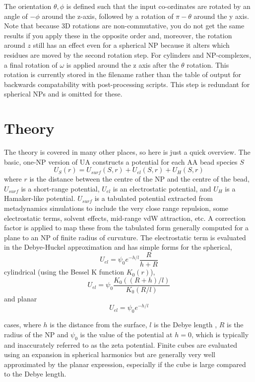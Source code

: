 \documentclass[10pt,a4paper,onecolumn]{report}
\begin{document}
 The orientation $\theta,\phi$ is defined such that the input co-ordinates are rotated by an angle of $-\phi$ around the z-axis, followed by a rotation of $\pi - \theta$ around the y axis. Note that because 3D rotations are non-commutative, you do not get the same results if you apply these in the opposite order and, moreover, the rotation around $z$ still has an effect even for a spherical NP because it alters which residues are moved by the second rotation step.  For cylinders and NP-complexes, a final rotation of $\omega$ is applied around the z axis after the $\theta$ rotation. This rotation is currently stored in the filename rather than the table of output for backwards compatability with post-processing scripts. This step is redundant for spherical NPs and is omitted for these. 

\section{Theory}
The theory is covered in many other places, so here is just a quick overview. The basic, one-NP version of UA constructs a potential for each AA bead species $S$
\begin{equation}
U_S(r) =   U_{surf}(S,r) + U_{el}(S,r) +  U_H(S,r)
\end{equation} 
 where $r$ is the distance between the centre of the NP and the centre of the bead, $U_{surf}$ is a short-range potential, $U_{el}$ is an electrostatic potential, and  $U_H$ is a Hamaker-like potential. $U_{surf}$ is a tabulated potential extracted from metadynamics simulations to include the very close range repulsion, some electrostatic terms, solvent effects, mid-range vdW attraction, etc. A correction factor is applied to map these from the tabulated form generally computed for a plane to an NP of finite radius of curvature. The electrostatic term is evaluated in the Debye-Huckel approximation and has simple forms for the spherical,
 \begin{equation}
 U_{el} = \psi_0 e^{-h/l}\frac{R}{h + R}
 \end{equation}
  cylindrical (using the Bessel K function $K_0(r)$),
 \begin{equation}
 U_{el} = \psi_0  \frac{K_0( (R + h)/l)}{K_0(R/l)}
 \end{equation}
and planar
  \begin{equation}
 U_{el} = \psi_0 e^{-h/l}  
 \end{equation}

 cases, where $h$ is the distance from the surface, $l$ is the Debye length , $R$ is the radius of the NP and $\psi_0$ is the value of the potential at $h=0$, which is typically and inaccurately referred to as the zeta potential. Finite cubes are evaluated using an expansion in spherical harmonics but are generally very well approximated by the planar expression, especially if the cube is large compared to the Debye length. 
\end{document}
